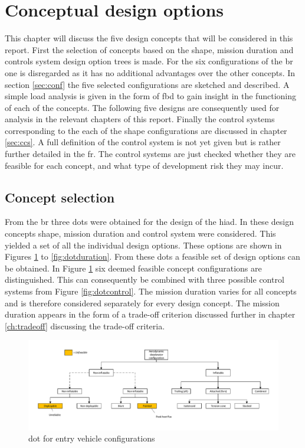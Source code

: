\section{Conceptual design options} \label{ch:options}
This chapter will discuss the five design concepts that will be considered in this report. First the selection of concepts based on the shape, mission duration and controls system design option trees is made. For the six configurations of the \gls{br} one is disregarded as it has no additional advantages over the other concepts. In section \ref{sec:conf} the five selected configurations are sketched and described. A simple load analysis is given in the form of \gls{fbd} to gain insight in the functioning of each of the concepts. The following five designs are consequently used for analysis in the relevant chapters of this report. Finally the control systems corresponding to the each of the shape configurations are discussed in chapter \ref{sec:ccs}. A full definition of the control system is not yet given but is rather further detailed in the \gls{fr}. The control systems are just checked whether they are feasible for each concept, and what type of development risk they may incur.

\subsection{Concept selection}
 From the \acrfull{br} three \glspl{dot} were obtained for the design of the \gls{hiad}. In these design concepts shape, mission duration and control system were considered. This yielded a set of all the individual design options. These options are shown in Figures \ref{fig:dotshape} to \ref{fig:dotduration}. From these \glspl{dot} a feasible set of design options can be obtained. In Figure  \ref{fig:dotshape} six deemed feasible concept configurations are distinguished. This can consequently be combined with three possible control systems from Figure  \ref{fig:dotcontrol}. The mission duration varies for all concepts and is therefore considered separately for every design concept. The mission duration appears in the form of a trade-off criterion discussed further in chapter \ref{ch:tradeoff} discussing the trade-off criteria.

\begin{figure}[H]
\hspace{-23mm}
\includegraphics[width = 1.25\textwidth]{Figure/DOT_configuration.pdf}
\vspace{-5mm}
\caption{\acrlong{dot} for entry vehicle configurations}
\label{fig:dotshape}
\end{figure}

